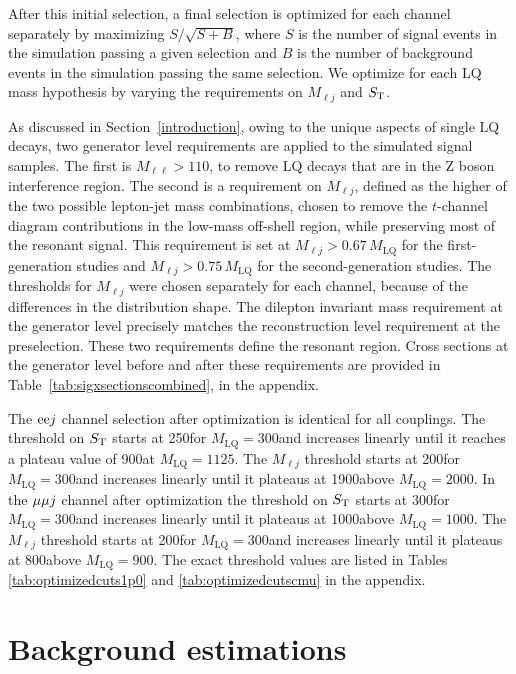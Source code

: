 After this initial selection, a final selection is optimized for each channel separately by maximizing $S/\sqrt{S+B}$, where $S$ is the number of signal events in the simulation passing a given selection and $B$ is the number of background events in the simulation passing the same selection.  We optimize for each LQ mass hypothesis by varying the requirements on $M_{\ell j}$ and $S_{\mathrm{T}}$.

As discussed in Section~\ref{introduction}, owing to the unique aspects of single LQ decays, two generator level requirements are applied to the simulated signal samples.  The first is $M_{\ell\ell} > 110$\GeV, to remove LQ decays that are in the Z boson interference region.  The second is a requirement on $M_{\ell j}$, defined as the higher of the two possible lepton-jet mass combinations, chosen to remove the $t$-channel diagram contributions in the low-mass off-shell region, while preserving most of the resonant signal.  This requirement is set at $M_{\ell j} > 0.67 \, M_{\text{LQ}}$ for the first-generation studies and $M_{\ell j} > 0.75 \, M_{\text{LQ}}$ for the second-generation studies.  The thresholds for $M_{\ell j}$ were chosen separately for each channel, because of the differences in the distribution shape.  The dilepton invariant mass requirement at the generator level precisely matches the reconstruction level requirement at the preselection.  These two requirements define the resonant region.  Cross sections at the generator level before and after these requirements are provided in Table~\ref{tab:sigxsectionscombined}, in the appendix.

The $\mathrm{e} \mathrm{e} j$ channel selection after optimization is identical for all couplings.  The threshold on $S_{\mathrm{T}}$ starts at 250\GeV for $M_{\text{LQ}}=300$\GeV and increases linearly until it reaches a plateau value of 900\GeV at $M_{\text{LQ}}=1125$\GeV.  The $M_{\ell j}$ threshold starts at 200\GeV for $M_{\text{LQ}}=300$\GeV and increases linearly until it plateaus at 1900\GeV above $M_{\text{LQ}}=2000$\GeV.  In the ${\mu} {\mu} j$ channel after optimization the threshold on $S_{\mathrm{T}}$ starts at 300\GeV for $M_{\text{LQ}}=300$\GeV and increases linearly until it plateaus at 1000\GeV above $M_{\text{LQ}}=1000$\GeV.  The $M_{\ell j}$ threshold starts at 200\GeV for $M_{\text{LQ}}=300$\GeV and increases linearly until it plateaus at 800\GeV above $M_{\text{LQ}}=900$\GeV.  The exact threshold values are listed in Tables \ref{tab:optimizedcuts1p0} and \ref{tab:optimizedcutscmu} in the appendix.

\section{Background estimations}
\label{backgrounds}

